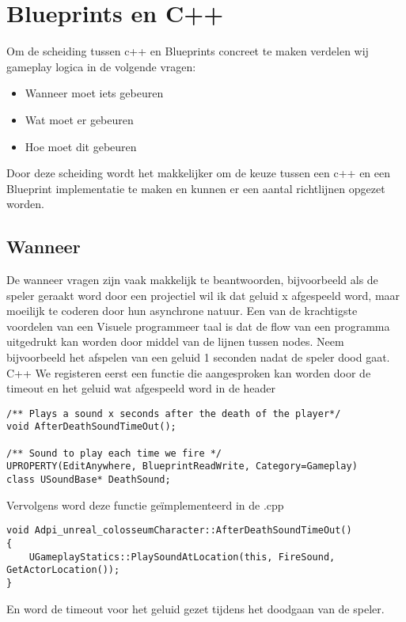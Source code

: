 \lstset {language=C++}
\chapter{Blueprints en C++}

Om de scheiding tussen c++ en Blueprints concreet te maken verdelen wij gameplay logica in de volgende vragen:

\begin{itemize}
	\item Wanneer moet iets gebeuren
	\item Wat moet er gebeuren
	\item Hoe moet dit gebeuren
\end{itemize}

Door deze scheiding wordt het makkelijker om de keuze tussen een c++ en een Blueprint implementatie te maken en kunnen er een aantal richtlijnen opgezet worden.

\section{Wanneer}
De wanneer vragen zijn vaak makkelijk te beantwoorden, bijvoorbeeld als de speler geraakt word door een projectiel wil ik dat geluid x afgespeeld word, maar moeilijk te coderen door hun asynchrone natuur. Een van de krachtigste voordelen van een Visuele programmeer taal is dat de flow van een programma uitgedrukt kan worden door middel van de lijnen tussen nodes. Neem bijvoorbeeld het afspelen van een geluid 1 seconden nadat de speler dood gaat.
C++
We registeren eerst een functie die aangesproken kan worden door de timeout en het geluid wat afgespeeld word in de header

\begin{lstlisting}	
/** Plays a sound x seconds after the death of the player*/
void AfterDeathSoundTimeOut();

/** Sound to play each time we fire */
UPROPERTY(EditAnywhere, BlueprintReadWrite, Category=Gameplay)
class USoundBase* DeathSound;
\end{lstlisting}

Vervolgens word deze functie geïmplementeerd in de .cpp

\begin{lstlisting}
void Adpi_unreal_colosseumCharacter::AfterDeathSoundTimeOut() 
{
	UGameplayStatics::PlaySoundAtLocation(this, FireSound, GetActorLocation());
}
\end{lstlisting}

En word de timeout voor het geluid gezet tijdens het doodgaan van de speler.

